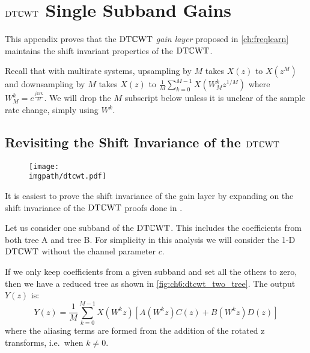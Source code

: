 \chapter{$\mathrm{DT}\mathbb{C}\mathrm{WT}$ Single Subband Gains}\label{app:ch6:dtcwt}
\def \path {freqlearn/}
\def \imgpath {freqlearn/images}

This appendix proves that the $\mathrm{DT}\mathbb{C}\mathrm{WT}$ \emph{gain layer} proposed in
\autoref{ch:freqlearn} maintains the shift invariant properties of the
$\mathrm{DT}\mathbb{C}\mathrm{WT}$.

Recall that with multirate systems, upsampling by $M$ takes $X(z)$ to
$X(z^M)$ and downsampling by $M$ takes $X(z)$ to $\frac{1}{M}\sum_{k=0}^{M-1} X(W_M^k
z^{1/M})$ where $W_M^k = e^{\frac{j2\pi k}{M}}$. We will drop the $M$ subscript
below unless it is unclear of the sample rate change, simply using $W^k$.


\section{Revisiting the Shift Invariance of the $\mathrm{DT}\mathbb{C}\mathrm{WT}$}

\begin{figure}[t]
  \centering
  \texttt{[image: \\imgpath/dtcwt.pdf]}
  \label{fig:ch6:dtcwt_two_tree}
\end{figure}
It is easiest to prove the shift invariance of the gain layer by expanding on
the shift invariance of the $\mathrm{DT}\mathbb{C}\mathrm{WT}$ proofs done in
\cite{kingsbury_complex_2001}.

Let us consider one subband of the $\mathrm{DT}\mathbb{C}\mathrm{WT}$. This includes the coefficients from
both tree A and tree B. For simplicity in this analysis we will consider the 1-D
$\mathrm{DT}\mathbb{C}\mathrm{WT}$ without the channel parameter $c$. 

If we only keep coefficients from a given
subband and set all the others to zero, then we have a reduced tree as shown in
\autoref{fig:ch6:dtcwt_two_tree}. The output $Y(z)$ is:
%
\begin{equation}
  Y(z) = \frac{1}{M} \sum_{k=0}^{M-1}X(W^k z) \left[A(W^k z)C(z) + B(W^k z)D(z)\right]
  \label{eq:ch6:aliasing}
\end{equation}
%
where the aliasing terms are formed from the addition of the rotated z
transforms, i.e.\ when $k \neq 0$.

